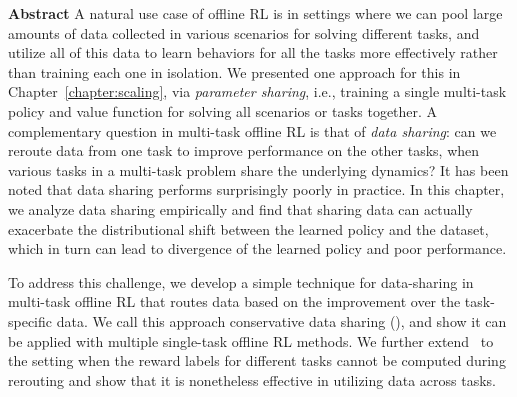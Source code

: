 \documentclass[../thesis.tex]{subfiles}
\begin{document}

\vspace{-0.4cm}
\begin{AIbox}{\large{\textbf{Abstract}}}
\vspace{4mm}
A natural use case of offline RL is in settings where we can pool large amounts of data collected in various scenarios for solving different tasks, and utilize all of this data to learn behaviors for all the tasks more effectively rather than training each one in isolation. We presented one approach for this in Chapter~\ref{chapter:scaling}, via \emph{parameter sharing}, i.e., training a single multi-task policy and value function for solving all scenarios or tasks together. A complementary question in multi-task offline RL is that of \emph{data sharing}: can we reroute data from one task to improve performance on the other tasks, when various tasks in a multi-task problem share the underlying dynamics? It has been noted that data sharing performs surprisingly poorly in practice. In this chapter, we analyze data sharing empirically and find that sharing data can actually exacerbate the distributional shift between the learned policy and the dataset, which in turn can lead to divergence of the learned policy and poor performance.

To address this challenge, we develop a simple technique for data-sharing in multi-task offline RL that routes data based on the improvement over the task-specific data. We call this approach conservative data sharing (\cdsmethodname), and show it can be applied with multiple single-task offline RL methods. We further extend \cdsmethodname\ to the setting when the reward labels for different tasks cannot be computed during rerouting and show that it is nonetheless effective in utilizing data across tasks. 
\vspace{2mm}
\end{AIbox}
\end{document}
